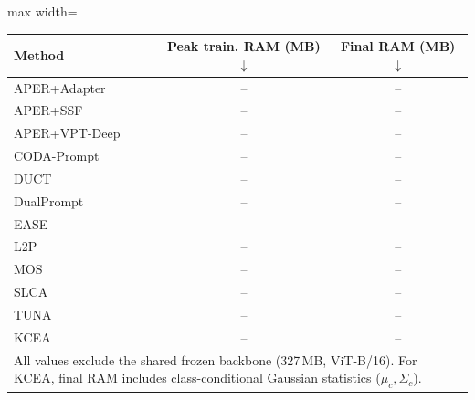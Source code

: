 \renewcommand{\arraystretch}{0.95}
\begin{adjustbox}{max width=\textwidth}
\footnotesize
\begin{tabular}{l c c}
\toprule
Method & \textbf{Peak train. RAM (MB)} $\downarrow$ & \textbf{Final RAM (MB)} $\downarrow$ \\
\midrule
APER+Adapter & -- & -- \\
APER+SSF & -- & -- \\
APER+VPT-Deep & -- & -- \\
CODA-Prompt & -- & -- \\
DUCT & -- & -- \\
DualPrompt & -- & -- \\
EASE & -- & -- \\
L2P & -- & -- \\
MOS & -- & -- \\
SLCA & -- & -- \\
TUNA & -- & -- \\
\midrule
KCEA & -- & -- \\
\multicolumn{3}{l}{\scriptsize All values exclude the shared frozen backbone (327\,MB, ViT-B/16). For KCEA, final RAM includes class-conditional Gaussian statistics ($\mu_c, \Sigma_c$).} \\
\bottomrule
\end{tabular}
\end{adjustbox}